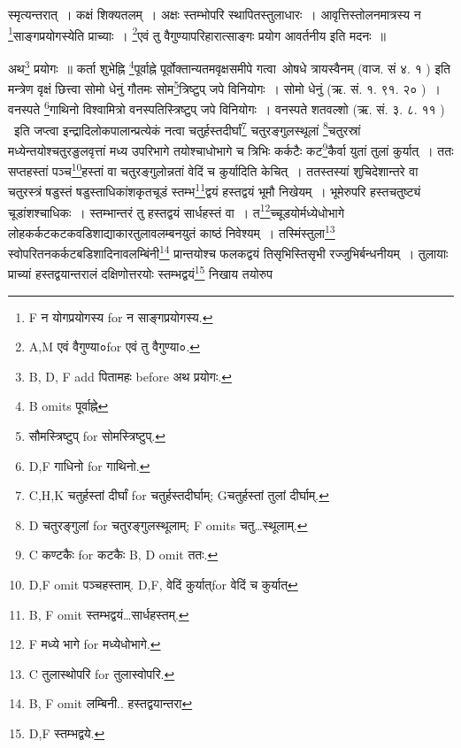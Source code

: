 \documentclass[11pt, openany]{book}
\begin{document}
स्मृत्यन्तरात्~। कक्षं शिक्यतलम्~। अक्षः स्तम्भोपरि स्थापितस्तुलाधारः~। आवृत्तिस्तोलनमात्रस्य न \renewcommand{\thefootnote}{8}\footnote{F न योगप्रयोगस्य for न साङ्गप्रयोगस्य.}साङ्गप्रयोगस्येति प्राच्याः~। \renewcommand{\thefootnote}{9}\footnote{A,M एवं वैगुण्या०for एवं तु वैगुण्या०.}एवं तु वैगुण्यापरिहारात्साङ्गः प्रयोग आवर्तनीय इति मदनः~॥

\newpage
{}

अथ\renewcommand{\thefootnote}{1}\footnote{B, D, F add पितामहः before अथ प्रयोगः.} प्रयोगः~॥ कर्ता शुभेह्नि \renewcommand{\thefootnote}{2}\footnote{B omits पूर्वाह्ने}पूर्वाह्ने पूर्वोक्तान्यतमवृक्षसमीपे गत्वा\textendash\ ओषधे त्रायस्वैनम् (वाज. सं ४. १ ) इति मन्त्रेण वृक्षं छित्त्वा सोमो धेनुं गौतमः सोम\renewcommand{\thefootnote}{3}\footnote{सौमस्त्रिष्टुप् for सोमस्त्रिष्टुप्.}त्रिष्टुप् जपे विनियोगः~। सोमो धेनुं (ऋ. सं. १. ९१. २० )~। वनस्पते \renewcommand{\thefootnote}{4}\footnote{D,F गाधिनो for गाथिनो.}गाथिनो विश्वामित्रो वनस्पतिस्त्रिष्टुप् जपे विनियोगः~। वनस्पते शतवल्शो (ऋ. सं. ३. ८. ११ ) \textendash\ इति जप्त्वा इन्द्रादिलोकपालान्प्रत्येकं नत्वा चतुर्हस्तदीर्घां\renewcommand{\thefootnote}{5}\footnote{C,H,K चतुर्हस्तां दीर्घां for चतुर्हस्तदीर्घाम्; Gचतुर्हस्तां तुलां दीर्घाम्.} चतुरङ्गुलस्थूलां \renewcommand{\thefootnote}{6}\footnote{D चतुरङ्गुलां for चतुरङ्गुलस्थूलाम्; F omits चतु\ldots स्थूलाम्.}चतुरस्रां मध्येन्तयोश्चतुरङुलवृत्तां मध्य उपरिभागे तयोश्चाधोभागे च त्रिभिः कर्कटैः कट\renewcommand{\thefootnote}{7}\footnote{C कण्टकैः for कटकैः B, D omit ततः.}कैर्वा युतां तुलां कुर्यात्~। ततः सप्तहस्तां पञ्च\renewcommand{\thefootnote}{8}\footnote{D,F omit पञ्चहस्ताम्. D,F, वेदिं कुर्यात्for वेदिं च कुर्यात्}हस्तां वा चतुरङ्गुलोन्नतां वेदिं च कुर्यादिति केचित्~। ततस्तस्यां शुचिदेशान्तरे वा चतुरस्त्रं षडुस्तं षडुस्ताधिकांशकृतचूडं स्तम्भ\renewcommand{\thefootnote}{9}\footnote{B, F omit स्तम्भद्वयं\ldots सार्धहस्तम्.}द्वयं हस्तद्वयं भूमौ निखेयम्~। भूमेरुपरि हस्तचतुष्ट्यं चूडांशश्चाधिकः~। स्तम्भान्तरं तु हस्तद्वयं सार्धहस्तं वा~। त\renewcommand{\thefootnote}{10}\footnote{F मध्ये भागे for मध्येधोभागे.}च्चूडयोर्मध्येधोभागे लोहकर्कटकटकवडिशाद्याकारतुलावलम्बनयुतं काष्ठं निवेश्यम्~। तस्मिंस्तुला\renewcommand{\thefootnote}{11}\footnote{C तुलास्थोपरि for तुलास्वोपरि.} स्वोपरितनकर्कटबडिशादिनावलम्बिंनी\renewcommand{\thefootnote}{12}\footnote{B, F omit लम्बिनी.. हस्तद्वयान्तरा} प्रान्तयोश्च फलकद्वयं तिसृभिस्तिसृभी रज्जुभिर्बन्धनीयम्~। तुलायाः प्राच्यां हस्तद्वयान्तरालं दक्षिणोत्तरयोः स्तम्भद्वयं\renewcommand{\thefootnote}{13}\footnote{D,F स्तम्भद्वये.} निखाय तयोरुप
\end{document}
